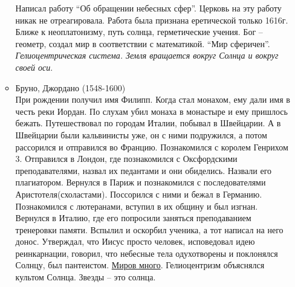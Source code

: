 \documentclass[a4paper,12pt]{report} %
\begin{document}
\begin{itemize}
\begin{itemize}
Написал работу ``Об обращении небесных сфер''. Церковь на эту работу
никак не отреагировала. Работа была признана еретической только
1616г.\\
Ближе к неоплатонизму, путь солнца, герметические учения. Бог --
геометр, создал мир в соответствии с математикой. ``Мир
сферичен''. \textit{Гелиоцентрическая система. Земля вращается вокруг Солнца и
вокруг своей оси}.
\item Бруно, Джордано (1548-1600)\\
При рождении получил имя Филипп. Когда стал монахом, ему дали имя в
честь реки Иордан. По слухам убил монаха в монастыре и ему пришлось
бежать. Путешествовал по городам Италии, побывал в Швейцарии. А в
Швейцарии были кальвинисты уже, он с ними подружился, а потом
рассорился и отправился во Францию. Познакомился с королем Генрихом
3. Отправился в Лондон, где познакомился с Оксфордскими
преподавателями, назвал их педантами и они обиделись. Назвали его
плагиатором. Вернулся в Париж и познакомился с последователями
Аристотеля(схоластами). Поссорился с ними и бежал в
Германию. Познакомился с лютеранами, вступил в их общину и был
изгнан. Вернулся в Италию, где его попросили заняться преподаванием
тренеровки памяти. Вспылил и оскорбил ученика, а тот написал на него
донос. Утверждал, что Иисус просто человек, исповедовал идею
реинкарнации, говорил, что небесные тела одухотворены и поклонялся
Солнцу, был пантеистом. \underline{Миров много}. Гелиоцентризм объяснялся
культом Солнца. Звезды -- это солнца.


\end{itemize}
\end{itemize}
\end{document}

